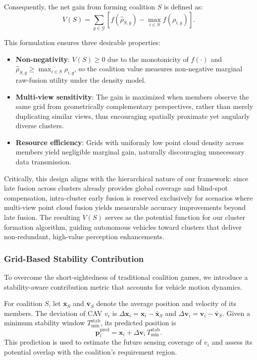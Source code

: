 \documentclass[conference]{IEEEtran}
\begin{document}
Consequently, the net gain from forming coalition $S$ is defined as:
\begin{equation}
V(S) = \sum_{g \in \mathcal{G}} \left[ f(\hat{\rho}_{S,g}) - \max_{i \in S} f(\rho_{i,g}) \right].
\label{eq:V_overlap}
\end{equation}

This formulation ensures three desirable properties:
\begin{itemize}
    \item \textbf{Non-negativity}: $V(S) \geq 0$ due to the monotonicity of $f(\cdot)$ and $\hat{\rho}_{S,g} \geq \max_{i \in S} \rho_{i,g}$, so the coalition value measures non-negative marginal raw-fusion utility under the density model.
    \item \textbf{Multi-view sensitivity}: The gain is maximized when members observe the same grid from geometrically complementary perspectives, rather than merely duplicating similar views, thus encouraging spatially proximate yet angularly diverse clusters.
    \item \textbf{Resource efficiency}: Grids with uniformly low point cloud density across members yield negligible marginal gain, naturally discouraging unnecessary data transmission.
\end{itemize}

Critically, this design aligns with the hierarchical nature of our framework: since late fusion across clusters already provides global coverage and blind-spot compensation, intra-cluster early fusion is reserved exclusively for scenarios where multi-view point cloud fusion yields measurable accuracy improvements beyond late fusion. The resulting $V(S)$ serves as the potential function for our cluster formation algorithm, guiding autonomous vehicles toward clusters that deliver non-redundant, high-value perception enhancements.

\subsubsection{Grid-Based Stability Contribution}

To overcome the short-sightedness of traditional coalition games, we introduce a stability-aware contribution metric that accounts for vehicle motion dynamics.

For coalition $S$, let $\bar{\mathbf{x}}_S$ and $\bar{\mathbf{v}}_S$ denote the average position and velocity of its members. The deviation of CAV $v_i$ is $\Delta\mathbf{x}_i = \mathbf{x}_i - \bar{\mathbf{x}}_S$ and $\Delta\mathbf{v}_i = \mathbf{v}_i - \bar{\mathbf{v}}_S$. Given a minimum stability window $T_{\min}^{\mathrm{stab}}$, its predicted position is
\begin{equation}
\mathbf{p}_i^{\mathrm{pred}} = \mathbf{x}_i + \Delta\mathbf{v}_i \, T_{\min}^{\mathrm{stab}}.
\label{eq:x_pred_vec}
\end{equation}
This prediction is used to estimate the future sensing coverage of $v_i$ and assess its potential overlap with the coalition's requirement region.
\end{document}
